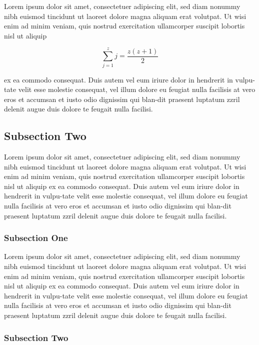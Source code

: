 \documentclass{vgtc}                          %
\begin{document}
Lorem ipsum dolor sit amet, consectetuer adipiscing elit, sed diam nonummy nibh euismod tincidunt ut laoreet dolore magna aliquam erat volutpat. Ut wisi enim ad minim veniam, quis nostrud exercit­ation ullamcorper suscipit lobortis nisl ut aliquip 

\begin{equation}
 \sum_{j=1}^{z} j = \frac{z(z+1)}{2}
\end{equation}

ex ea commodo consequat. Duis autem vel eum iriure dolor in hendrerit in vulpu-tate velit esse molestie consequat, vel illum dolore eu feugiat nulla facilisis at vero eros et accumsan et iusto odio dignissim qui blan-dit praesent luptatum zzril delenit augue duis dolore te feugait nulla facilisi.

\subsection{Subsection Two} \label{sec:results}

Lorem ipsum dolor sit amet, consectetuer adipiscing elit, sed diam nonummy nibh euismod tincidunt ut laoreet dolore magna aliquam erat volutpat. Ut wisi enim ad minim veniam, quis nostrud exercit­ation ullamcorper suscipit lobortis nisl ut aliquip ex ea commodo consequat. Duis autem vel eum iriure dolor in hendrerit in vulpu-tate velit esse molestie consequat, vel illum dolore eu feugiat nulla facilisis at vero eros et accumsan et iusto odio dignissim qui blan-dit praesent luptatum zzril delenit augue duis dolore te feugait nulla facilisi.

\subsubsection{Subsection One} \label{sec:conclusion}

Lorem ipsum dolor sit amet, consectetuer adipiscing elit, sed diam nonummy nibh euismod tincidunt ut laoreet dolore magna aliquam erat volutpat. Ut wisi enim ad minim veniam, quis nostrud exercit­ation ullamcorper suscipit lobortis nisl ut aliquip ex ea commodo consequat. Duis autem vel eum iriure dolor in hendrerit in                                                                    vulpu-tate velit esse molestie consequat, vel illum dolore eu feugiat nulla facilisis at vero eros et accumsan et iusto odio dignissim qui blan-dit praesent luptatum zzril delenit augue duis dolore te feugait nulla facilisi.

\subsubsection{Subsection Two}
\end{document}
